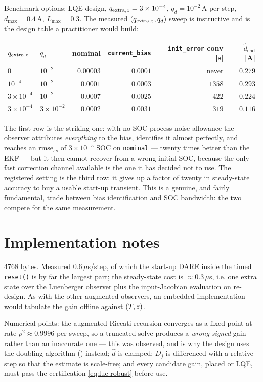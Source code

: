 Benchmark options: LQE design, $q_{\mathrm{extra},z}=3\times10^{-4}$, $q_d = 10^{-2}$\,A per
step, $d_{\max}=0.4$\,A, $L_{\max}=0.3$.  The measured $(q_{\mathrm{extra},z},q_d)$ sweep is
instructive and is the design table a practitioner would build:
\begin{center}
\begin{tabular}{@{}llrrrr@{}}
\toprule
$q_{\mathrm{extra},z}$ & $q_d$ & nominal & \texttt{current\_bias} & \texttt{init\_error} conv [s] & $\hat{d}_{\mathrm{end}}$ [A] \\
\midrule
$0$ & $10^{-2}$ & $0.00003$ & $0.0001$ & never & $0.279$ \\
$10^{-4}$ & $10^{-2}$ & $0.0001$ & $0.0003$ & $1358$ & $0.293$ \\
$3\!\times\!10^{-4}$ & $10^{-2}$ & $0.0007$ & $0.0025$ & $422$ & $0.224$ \\
$3\!\times\!10^{-4}$ & $3\!\times\!10^{-2}$ & $0.0002$ & $0.0031$ & $319$ & $0.116$ \\
\bottomrule
\end{tabular}
\end{center}
The first row is the striking one: with no SOC process-noise allowance the observer attributes
\emph{everything} to the bias, identifies it almost perfectly, and reaches an
$\mathrm{rmse}_{ss}$ of $3\times10^{-5}$ SOC on \texttt{nominal} --- twenty times better than the
EKF --- but it then cannot recover from a wrong initial SOC, because the only fast correction
channel available is the one it has decided not to use.  The registered setting is the third row:
it gives up a factor of twenty in steady-state accuracy to buy a usable start-up transient.  This
is a genuine, and fairly fundamental, trade between bias identification and SOC bandwidth: the two
compete for the same measurement.

\section{Implementation notes}
$4768$ bytes.  Measured $0.6\,\mu$s/step, of which the start-up DARE inside the timed
\texttt{reset()} is by far the largest part; the steady-state cost is $\approx0.3\,\mu$s, i.e. one
extra state over the Luenberger observer plus the input-Jacobian evaluation on re-design.  As with the other augmented observers, an embedded implementation would tabulate the
gain offline against $(T,z)$.

Numerical points: the augmented Riccati recursion converges as a fixed point at rate
$\rho^2\approx0.9996$ per sweep, so a truncated solve produces a \emph{wrong-signed} gain rather
than an inaccurate one --- this was observed, and is why the design uses the doubling algorithm
() instead; $\hat{d}$ is clamped; $D_j$ is differenced with a relative step so that
the estimate is scale-free; and every candidate gain, placed or LQE, must pass the certification
\eqref{eq:lue-robust} before use.

